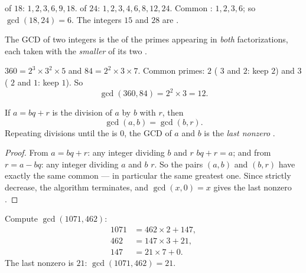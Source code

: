 \begin{example}
 of $18$: $1, 2, 3, 6, 9, 18$.  of $24$: $1, 2, 3, 4, 6,
8, 12, 24$. Common : $1, 2, 3, 6$; so $\gcd(18, 24) = 6$. The
integers $15$ and $28$ are .
\end{example}

\begin{proposition}\label{prop:g9:arith:gcdfact}
The GCD of two integers is the  of the primes appearing in
\emph{both} factorizations, each taken with the \emph{smaller} of its two
.
\end{proposition}
\admitted

\begin{example}\label{ex:g9:arith:gcdfact}
$360 = 2^3 \times 3^2 \times 5$ and $84 = 2^2 \times 3 \times 7$. Common
primes: $2$ ( $3$ and $2$: keep $2$) and $3$ ( $2$ and
$1$: keep $1$). So
\[
\gcd(360, 84) = 2^2 \times 3 = 12 .
\]
\end{example}

\begin{theorem}\label{thm:g9:arith:euclidalgo}
If $a = bq + r$ is the division of $a$ by $b$ with  $r$, then
\[
\gcd(a, b) = \gcd(b, r).
\]
Repeating divisions until the  is $0$, the GCD of $a$ and $b$ is
the \emph{last nonzero }.
\end{theorem}

\begin{proof}
From $a = bq + r$: any integer dividing $b$ and $r$  $bq + r = a$;
and from $r = a - bq$: any integer dividing $a$ and $b$  $r$. So
the pairs $(a, b)$ and $(b, r)$ have exactly the same common  ---
in particular the same greatest one. Since  strictly decrease,
the algorithm terminates, and $\gcd(x, 0) = x$ gives the last nonzero
.
\end{proof}

\begin{example}\label{ex:g9:arith:euclidalgo}
Compute $\gcd(1071, 462)$:
\begin{align*}
1071 &= 462 \times 2 + 147, \\
462 &= 147 \times 3 + 21, \\
147 &= 21 \times 7 + 0 .
\end{align*}
The last nonzero  is $21$: $\gcd(1071, 462) = 21$.
\end{example}

